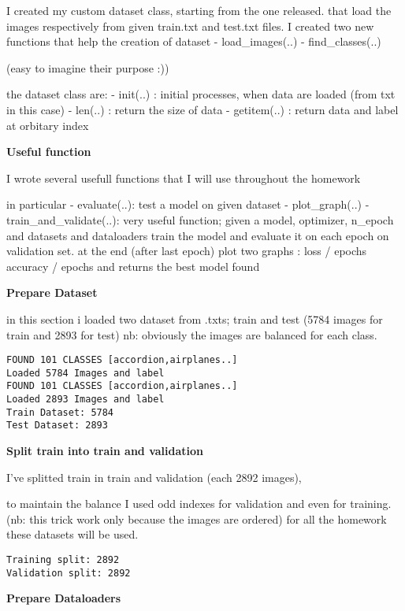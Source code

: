\documentclass[11pt]{article}
\begin{document}
    I created my custom dataset class, starting from the one released. that
load the images respectively from given train.txt and test.txt files. I
created two new functions that help the creation of dataset -
load\_images(..) - find\_classes(..)

(easy to imagine their purpose :))

the dataset class are: - init(..) : initial processes, when data are
loaded (from txt in this case) - len(..) : return the size of data -
getitem(..) : return data and label at orbitary index

    \textbf{Useful function}

    I wrote several usefull functions that I will use throughout the
homework

in particular - evaluate(..): test a model on given dataset -
plot\_graph(..) - train\_and\_validate(..): very useful function; given
a model, optimizer, n\_epoch and datasets and dataloaders train the
model and evaluate it on each epoch on validation set. at the end (after
last epoch) plot two graphs : loss / epochs accuracy / epochs and
returns the best model found

    \textbf{Prepare Dataset}

    in this section i loaded two dataset from .txts; train and test (5784
images for train and 2893 for test) nb: obviously the images are
balanced for each class.

    \begin{Verbatim}[commandchars=\\\{\}]
FOUND 101 CLASSES [accordion,airplanes..]
Loaded 5784 Images and label
FOUND 101 CLASSES [accordion,airplanes..]
Loaded 2893 Images and label
Train Dataset: 5784
Test Dataset: 2893
\end{Verbatim}

    \textbf{Split train into train and validation}

    I've splitted train in train and validation (each 2892 images),

to maintain the balance I used odd indexes for validation and even for
training. (nb: this trick work only because the images are ordered) for
all the homework these datasets will be used.

    \begin{Verbatim}[commandchars=\\\{\}]
Training split: 2892
Validation split: 2892
\end{Verbatim}

    \textbf{Prepare Dataloaders}
\end{document}
